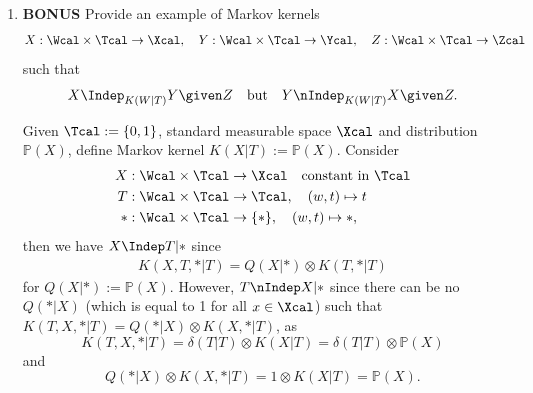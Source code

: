 \begin{enumerate}
\item \textbf{BONUS} Provide an example of Markov kernels 
\begin{align*}
  X : \Wcal \times \Tcal \rightarrow \Xcal, \quad Y : \Wcal \times \Tcal \rightarrow \Ycal, \quad Z : \Wcal \times \Tcal \rightarrow \Zcal
\end{align*}
such that $$X \Indep_{K(W|T)} Y \given Z \quad \text{but} \quad Y \nIndep_{K(W|T)} X \given Z.$$
\begin{gradedsolution}
  Given $\Tcal := \{0,1\}$, standard measurable space $\Xcal$ and distribution $\mathbb{P}(X)$, define Markov kernel $K(X|T):=\mathbb{P}(X)$. Consider
  \begin{align*}
    X&: \Wcal \times \Tcal \rightarrow \Xcal \quad \text{constant in $\Tcal$}\\
    T&:\Wcal\times \Tcal \rightarrow \Tcal, \quad (w, t) \mapsto t \\
    *&: \Wcal \times \Tcal \rightarrow \{*\}, \quad (w, t) \mapsto *,
  \end{align*}
  then we have $X\Indep T|*$ since
  \begin{align*}
    K(X, T, *|T) = Q(X|*) \otimes K(T, *|T)
  \end{align*}
  for $Q(X|*) := \mathbb{P}(X)$.  However, $T\nIndep X|*$ since there can be no $Q(*|X)$ (which is equal to 1 for all $x\in\Xcal$) such that $K(T, X, *|T) = Q(*|X)\otimes K(X, *|T)$, as
  $$K(T, X, *|T) = \delta(T|T)\otimes K(X|T) = \delta(T|T)\otimes \mathbb{P}(X)$$
  and 
  $$Q(*|X)\otimes K(X, *|T) = 1\otimes K(X|T) = \mathbb{P}(X).$$
\end{gradedsolution}

\end{enumerate}


